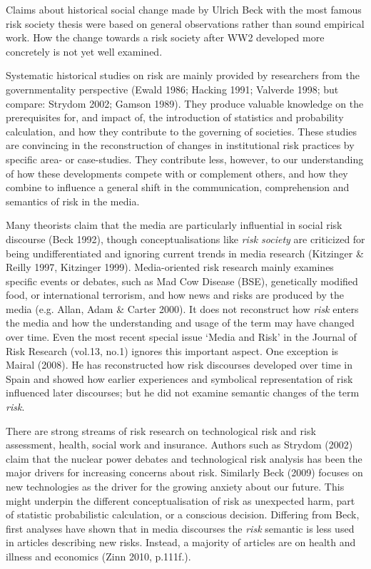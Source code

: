 Claims about historical social change made by Ulrich Beck with the most famous risk society thesis were based on general observations rather than sound empirical work. How the change towards a risk society after WW2 developed more concretely is not yet well examined.

Systematic historical studies on risk are mainly provided by researchers from the governmentality perspective (Ewald 1986; Hacking 1991; Valverde 1998; but compare: Strydom 2002; Gamson 1989). They produce valuable knowledge on the prerequisites for, and impact of, the introduction of statistics and probability calculation, and how they contribute to the governing of societies. These studies are convincing in the reconstruction of changes in institutional risk practices by specific area- or case-studies. They contribute less, however, to our understanding of how these developments compete with or complement others, and how they combine to influence a general shift in the communication, comprehension and semantics of risk in the media. 

Many theorists claim that the media are particularly influential in social risk discourse (Beck 1992), though conceptualisations like \emph{risk society} are criticized for being undifferentiated and ignoring current trends in media research (Kitzinger \& Reilly 1997, Kitzinger 1999). Media-oriented risk research mainly examines specific events or debates, such as Mad Cow Disease (BSE), genetically modified food, or international terrorism, and how news and risks are produced by the media (e.g. Allan, Adam \& Carter 2000). It does not reconstruct how \emph{risk} enters the media and how the understanding and usage of the term may have changed over time. Even the most recent special issue `Media and Risk' in the Journal of Risk Research (vol.13, no.1) ignores this important aspect. One exception is Mairal (2008). He has reconstructed how risk discourses developed over time in Spain and showed how earlier experiences and symbolical representation of risk influenced later discourses; but he did not examine semantic changes of the term \emph{risk}. 

There are strong streams of risk research on technological risk and risk assessment, health, social work and insurance. Authors such as Strydom (2002) claim that the nuclear power debates and technological risk analysis has been the major drivers for increasing concerns about risk. Similarly Beck (2009) focuses on new technologies as the driver for the growing anxiety about our future. This might underpin the different conceptualisation of risk as unexpected harm, part of statistic probabilistic calculation, or a conscious decision. Differing from Beck, first analyses have shown that in media discourses the \emph{risk} semantic is less used in articles describing new risks. Instead, a majority of articles are on health and illness and economics (Zinn 2010, p.111f.).

